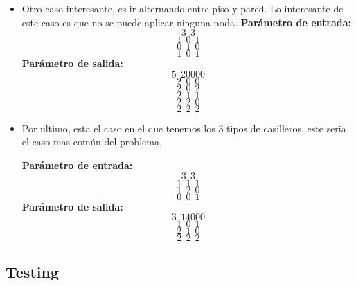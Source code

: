 \begin{itemize}
\item Otro caso interesante, es ir alternando entre piso y pared. Lo interesante de este caso es que no se puede aplicar ninguna poda.\newline
\textbf{Parámetro de entrada:} 
$$3\ \ 3$$
$$1\ \ 0\ \ 1$$
$$0\ \ 1\ \ 0$$
$$1\ \ 0\ \ 1$$
\textbf{Parámetro de salida:} 
$$5\ \ 20000$$
$$2\ \ 0\ \ 0$$
$$2\ \ 0\ \ 2$$
$$2\ \ 1\ \ 1$$
$$2\ \ 2\ \ 0$$
$$2\ \ 2\ \ 2$$
\newline


\item Por ultimo, esta el caso en el que tenemos los 3 tipos de casilleros, este seria el caso mas común del problema. \newline

\textbf{Parámetro de entrada:} 
$$3\ \ 3$$
$$1\ \ 1\ \ 1$$
$$1\ \ 2\ \ 0$$
$$0\ \ 0\ \ 1$$
\textbf{Parámetro de salida:} 
$$3\ \ 14000$$
$$1\ \ 0\ \ 1$$
$$2\ \ 1\ \ 0$$
$$2\ \ 2\ \ 2$$
\newline
\end{itemize}

\subsection{Testing}


